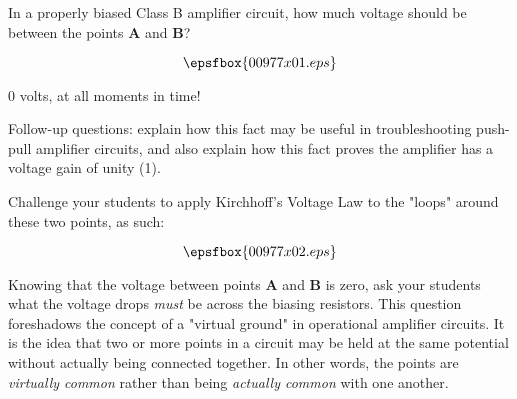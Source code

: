 

In a properly biased Class B amplifier circuit, how much voltage should be between the points {\bf A} and {\bf B}?

$$\epsfbox{00977x01.eps}$$







0 volts, at all moments in time!

\vskip 10pt

Follow-up questions: explain how this fact may be useful in troubleshooting push-pull amplifier circuits, and also explain how this fact proves the amplifier has a voltage gain of unity (1).







Challenge your students to apply Kirchhoff's Voltage Law to the "loops" around these two points, as such:

$$\epsfbox{00977x02.eps}$$

Knowing that the voltage between points {\bf A} and {\bf B} is zero, ask your students what the voltage drops {\it must} be across the biasing resistors.  This question foreshadows the concept of a "virtual ground" in operational amplifier circuits.  It is the idea that two or more points in a circuit may be held at the same potential without actually being connected together.  In other words, the points are {\it virtually common} rather than being {\it actually common} with one another.




